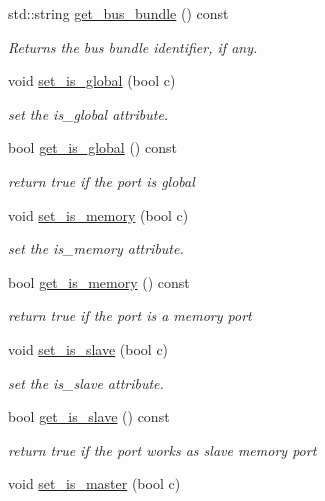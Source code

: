\begin{DoxyCompactItemize}
std\+::string \hyperlink{structport__o_ab3b76812ca210b6124ee07d4401380ed}{get\+\_\+bus\+\_\+bundle} () const
\begin{DoxyCompactList}\small\item\em Returns the bus bundle identifier, if any. \end{DoxyCompactList}\item 
void \hyperlink{structport__o_a4ede07d181467981977a7c051e8472ed}{set\+\_\+is\+\_\+global} (bool c)
\begin{DoxyCompactList}\small\item\em set the is\+\_\+global attribute. \end{DoxyCompactList}\item 
bool \hyperlink{structport__o_a2becd159f51389d709450683e536954c}{get\+\_\+is\+\_\+global} () const
\begin{DoxyCompactList}\small\item\em return true if the port is global \end{DoxyCompactList}\item 
void \hyperlink{structport__o_a7b1185147aed925a409401cd21d874fb}{set\+\_\+is\+\_\+memory} (bool c)
\begin{DoxyCompactList}\small\item\em set the is\+\_\+memory attribute. \end{DoxyCompactList}\item 
bool \hyperlink{structport__o_a2565771d94bfc442b11c18a22cbaf43d}{get\+\_\+is\+\_\+memory} () const
\begin{DoxyCompactList}\small\item\em return true if the port is a memory port \end{DoxyCompactList}\item 
void \hyperlink{structport__o_ad643139da2fb1b43326122f3ad460999}{set\+\_\+is\+\_\+slave} (bool c)
\begin{DoxyCompactList}\small\item\em set the is\+\_\+slave attribute. \end{DoxyCompactList}\item 
bool \hyperlink{structport__o_a48f4b97f6689fbebff334bf13d81088b}{get\+\_\+is\+\_\+slave} () const
\begin{DoxyCompactList}\small\item\em return true if the port works as slave memory port \end{DoxyCompactList}\item 
void \hyperlink{structport__o_a5564c529a4a5c479de4c8c044a453149}{set\+\_\+is\+\_\+master} (bool c)

\end{DoxyCompactItemize}

